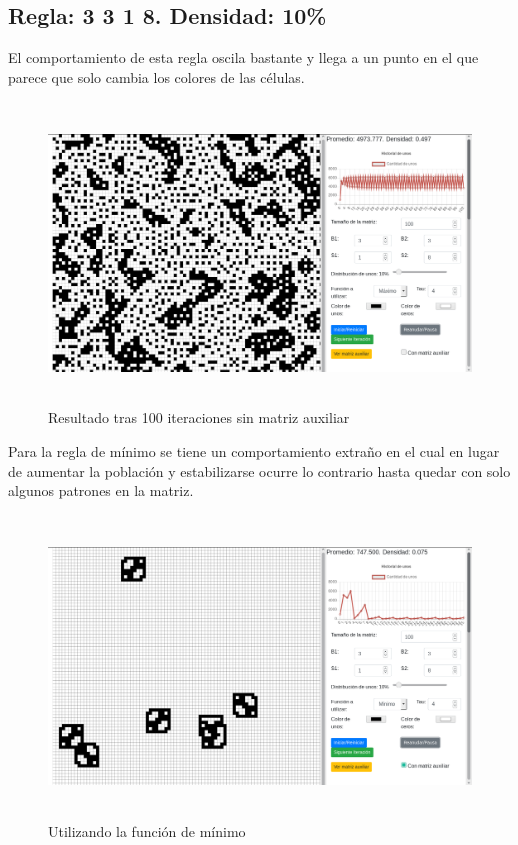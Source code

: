 \documentclass[12pt, titlepage]{article}
\begin{document}
\subsection{Regla: 3 3 1 8. Densidad: 10\%}
El comportamiento de esta regla oscila bastante y llega a un punto en el que parece que solo cambia los colores de las células.
\begin{figure}[H]
\begin{center}
 \includegraphics[width=15cm, height=8cm]{./img/3318.png}
 \caption{Resultado tras 100 iteraciones sin matriz auxiliar}
 \label{fig:3318}
\end{center}
\end{figure}
Para la regla de mínimo se tiene un comportamiento extraño en el cual en lugar de aumentar la población y estabilizarse ocurre lo contrario hasta quedar con solo algunos patrones en la matriz.
\begin{figure}[H]
\begin{center}
 \includegraphics[width=15cm, height=8cm]{./img/3318-min.png}
 \caption{Utilizando la función de mínimo}
 \label{fig:3318-min}
\end{center}
\end{figure}
\end{document}
